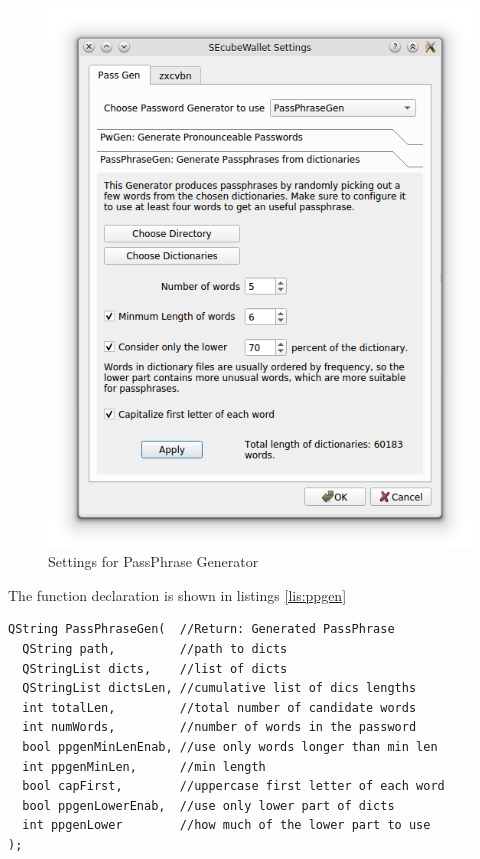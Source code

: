 \begin{figure}[htb]
  \centering
  \captionsetup{justification=centering}
  \includegraphics[width=0.8\columnwidth]{chapters/figures/development/ppgenSett.png}
  \caption{Settings for PassPhrase Generator}
  \label{fig:ppgenSett}
\end{figure}

The function declaration is shown in listings \ref{lis:ppgen}


\begin{lstlisting}[style=customc, float=htb, caption={PassPhraseGen function declaration}, label = {lis:ppgen}]
QString PassPhraseGen(  //Return: Generated PassPhrase
  QString path,         //path to dicts
  QStringList dicts,    //list of dicts
  QStringList dictsLen, //cumulative list of dics lengths
  int totalLen,         //total number of candidate words
  int numWords,         //number of words in the password
  bool ppgenMinLenEnab, //use only words longer than min len
  int ppgenMinLen,      //min length
  bool capFirst,        //uppercase first letter of each word
  bool ppgenLowerEnab,  //use only lower part of dicts
  int ppgenLower        //how much of the lower part to use
);
\end{lstlisting}

